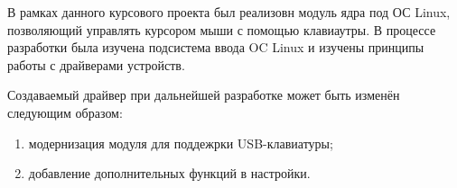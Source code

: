 В рамках данного курсового проекта был реализовн модуль ядра под ОС Linux, позволяющий управлять курсором мыши с помощью клавиаутры.
В процессе разработки была изучена подсистема ввода OC Linux и изучены принципы работы с драйверами устройств.

Создаваемый драйвер при дальнейшей разработке может быть изменён следующим образом:
\begin{enumerate}
	\item модернизация модуля для поддежрки USB-клавиатуры;
	\item добавление дополнительных функций в настройки.
\end{enumerate}